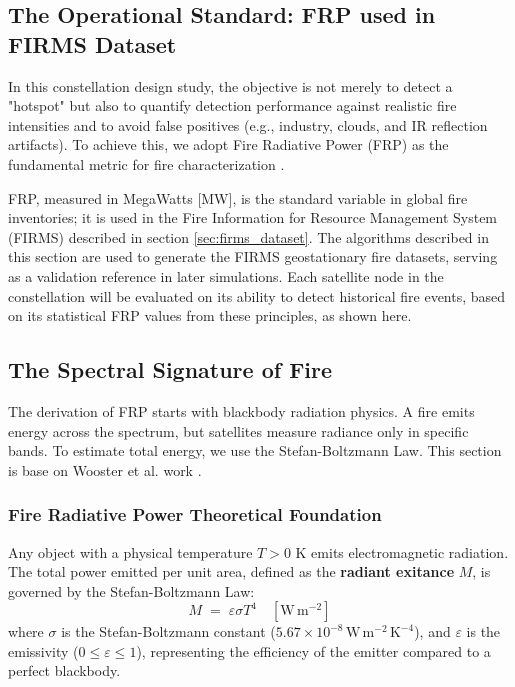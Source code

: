 \subsection{The Operational Standard: FRP used in FIRMS Dataset}
In this constellation design study, the objective is not merely to detect a "hotspot" but also to quantify detection performance against realistic fire intensities and to avoid false positives (e.g., industry, clouds, and IR reflection artifacts). To achieve this, we adopt Fire Radiative Power (FRP) as the fundamental metric for fire characterization .

FRP, measured in MegaWatts [MW], is the standard variable in global fire inventories; it is used in the Fire Information for Resource Management System (FIRMS) described in section \ref{sec:firms_dataset}. The algorithms described in this section are used to generate the FIRMS geostationary fire datasets, serving as a validation reference in later simulations. Each satellite node in the constellation will be evaluated on its ability to detect historical fire events, based on its statistical FRP values from these principles, as shown here.

\subsection{The Spectral Signature of Fire}
\label{311-the-spectral-signature-of-fire}

The derivation of FRP starts with blackbody radiation physics. A fire emits energy across the spectrum, but satellites measure radiance only in specific bands. To estimate total energy, we use the Stefan-Boltzmann Law. This section is base on Wooster et al. work \cite{wooster_retrieval_2005}.

\subsubsection{Fire Radiative Power Theoretical Foundation}
Any object with a physical temperature $T > 0$ K emits electromagnetic radiation. The total power emitted per unit area, defined as the \textbf{radiant exitance} $M$, is governed by the Stefan-Boltzmann Law:
\begin{equation}
    M \;=\; \varepsilon \sigma T^4 \quad [\mathrm{W\,m^{-2}}]
\end{equation}
where $\sigma$ is the Stefan-Boltzmann constant ($5.67 \times 10^{-8}\,\mathrm{W\,m^{-2}\,K^{-4}}$), and $\varepsilon$ is the emissivity ($0 \leq \varepsilon \leq 1$), representing the efficiency of the emitter compared to a perfect blackbody.

